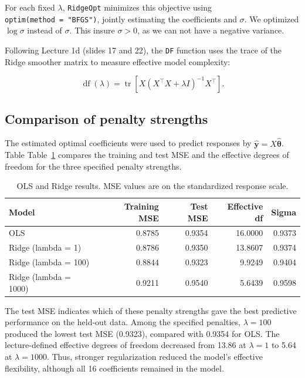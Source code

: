 \documentclass[
  english,
  11pt,
]{article}
\begin{document}
For each fixed \(\lambda\), \texttt{RidgeOpt} minimizes this objective
using \texttt{optim(method\ =\ "BFGS")}, jointly estimating the
coefficients and \(\sigma\). We optimized \(\log\sigma\) instead of
\(\sigma\). This insure \(\sigma>0\), as we can not have a negative
variance.

Following Lecture 1d (slides 17 and 22), the \texttt{DF} function uses
the trace of the Ridge smoother matrix to measure effective model
complexity:

\[
\operatorname{df}(\lambda)
=\operatorname{tr}\!\left[
X(X^\top X+\lambda I)^{-1}X^\top
\right].
\]

\pagebreak

\subsection{Comparison of penalty
strengths}\label{comparison-of-penalty-strengths}

The estimated optimal coefficients were used to predict responses by
\(\hat{\mathbf y}=X\hat{\boldsymbol\theta}\). Table
Table~\ref{tbl-a2-models} compares the training and test MSE and the
effective degrees of freedom for the three specified penalty strengths.

\begin{longtable}[]{@{}lrrrr@{}}

\caption{\label{tbl-a2-models}OLS and Ridge results. MSE values are on
the standardized response scale.}

\tabularnewline

\toprule\noalign{}
Model & Training MSE & Test MSE & Effective df & Sigma \\
\midrule\noalign{}
\endhead
\bottomrule\noalign{}
\endlastfoot
OLS & 0.8785 & 0.9354 & 16.0000 & 0.9373 \\
Ridge (lambda = 1) & 0.8786 & 0.9350 & 13.8607 & 0.9374 \\
Ridge (lambda = 100) & 0.8844 & 0.9323 & 9.9249 & 0.9404 \\
Ridge (lambda = 1000) & 0.9211 & 0.9540 & 5.6439 & 0.9598 \\

\end{longtable}

The test MSE indicates which of these penalty strengths gave the best
predictive performance on the held-out data. Among the specified
penalties, \(\lambda = 100\) produced the lowest test MSE (0.9323),
compared with 0.9354 for OLS. The lecture-defined effective degrees of
freedom decreased from 13.86 at \(\lambda=1\) to 5.64 at
\(\lambda=1000\). Thus, stronger regularization reduced the model's
effective flexibility, although all 16 coefficients remained in the
model.
\end{document}
